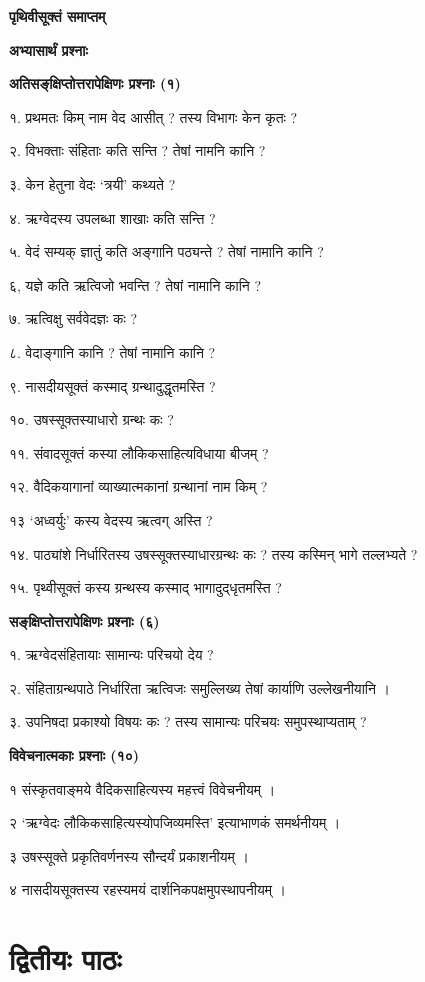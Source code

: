 \documentclass[11pt, a5paper]{article}
\begin{document}
\textbf{पृथिवीसूक्तं समाप्तम्}

\textbf{अभ्यासार्थं प्रश्नाः}

\textbf{अतिसङ्‌क्षिप्तोत्तरापेक्षिणः प्रश्नाः  (१)}

१. प्रथमतः किम् नाम वेद आसीत् ? तस्य विभागः केन कृतः ?

२. विभक्ताः संहिताः कति सन्ति ? तेषां नामनि कानि ?

३. केन हेतुना वेदः ‘त्रयी’ कथ्यते ?

४. ऋग्वेदस्य उपलब्धा शाखाः कति सन्ति ?

५. वेदं सम्यक् ज्ञातुं कति अङ्गानि पठ्यन्ते ? तेषां नामानि कानि ?

६, यज्ञे कति ऋत्विजो भवन्ति ? तेषां नामानि कानि ?

७. ऋत्विक्षु सर्ववेदज्ञः कः ?

८. वेदाङ्गानि कानि ? तेषां नामानि कानि ?

९. नासदीयसूक्तं कस्माद् ग्रन्थादुद्धृतमस्ति ?

१०. उषस्सूक्तस्याधारो ग्रन्थः कः ?

११. संवादसूक्तं कस्या लौकिकसाहित्यविधाया बीजम् ?

१२. वैदिकयागानां  व्याख्यात्मकानां ग्रन्थानां नाम किम् ?

१३ ‘अध्वर्युः’ कस्य वेदस्य ऋत्वग् अस्ति ?

१४. पाठ्यांशे निर्धारितस्य उषस्सूक्तस्याधारग्रन्थः कः ? तस्य कस्मिन् भागे तल्लभ्यते ?

१५. पृथ्वीसूक्तं कस्य ग्रन्थस्य कस्माद् भागादुद्‌धृतमस्ति ?

\textbf{सङ्‌क्षिप्तोत्तरापेक्षिणः प्रश्नाः (६)}

१. ऋग्वेदसंहितायाः सामान्यः परिचयो देय ?

२. संहिताग्रन्थपाठे निर्धारिता ऋत्विजः समुल्लिख्य तेषां कार्याणि उल्लेखनीयानि ।

३. उपनिषदा प्रकाश्यो विषयः कः ? तस्य सामान्यः परिचयः समुपस्थाप्यताम् ?

\textbf{विवेचनात्मकाः प्रश्नाः (१०)}

१ संस्कृतवाङ्‌मये वैदिकसाहित्यस्य महत्त्वं विवेचनीयम् ।

२ ‘ऋग्वेदः लौकिकसाहित्यस्योपजिव्यमस्ति’ इत्याभाणकं समर्थनीयम् ।

३ उषस्सूक्ते प्रकृतिवर्णनस्य सौन्दर्यं प्रकाशनीयम् ।

४ नासदीयसूक्तस्य रहस्यमयं दार्शनिकपक्षमुपस्थापनीयम् ।

\section{\textbf{द्वितीयः पाठः}}
\end{document}
